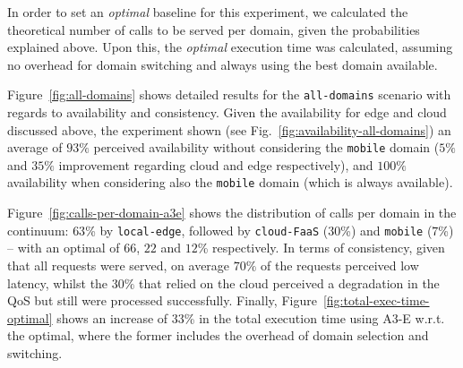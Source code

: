 


In order to set an \emph{optimal} baseline for this experiment, we calculated the theoretical number of calls to be served per domain, given the probabilities explained above. Upon this, the \emph{optimal} execution time was calculated, assuming no overhead for domain switching and always using the best domain available.

Figure~\ref{fig:all-domains} shows detailed results for the \texttt{all-domains} scenario with regards to availability and consistency. Given the availability for edge and cloud discussed above, the experiment shown (see Fig.~\ref{fig:availability-all-domains}) an average of $93\%$ perceived availability without considering the \texttt{mobile} domain ($5\%$ and $35\%$ improvement regarding cloud and edge respectively), and $100\%$ availability when considering also the \texttt{mobile} domain (which is always available). 

Figure~\ref{fig:calls-per-domain-a3e} shows the distribution of calls per domain in the continuum: $63$\% by \texttt{local-edge}, followed by \texttt{cloud-FaaS} ($30$\%) and \texttt{mobile} ($7$\%) -- with an optimal of $66$, $22$ and $12$\% respectively. In terms of consistency, given that all requests were served, on average $70\%$ of the requests perceived low latency, whilst the $30\%$ that relied on the cloud perceived a degradation in the QoS but still were processed successfully. Finally, Figure~\ref{fig:total-exec-time-optimal} shows an increase of $33$\% in the total execution time using A3-E w.r.t. the optimal, where the former includes the overhead of domain selection and switching.
 
